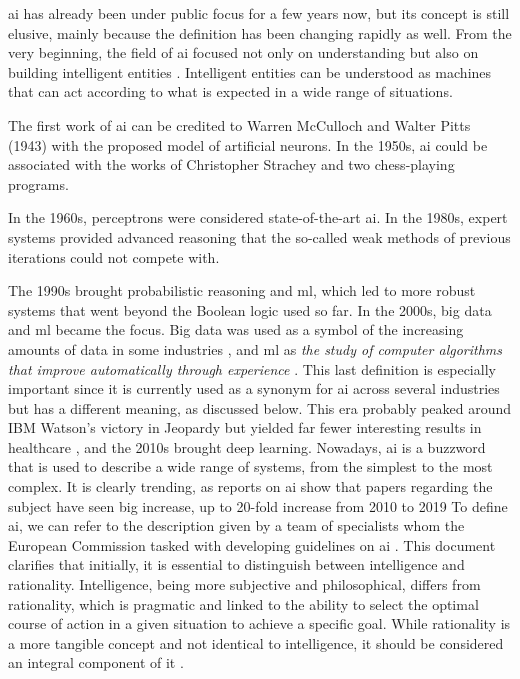 


\ac{ai} has already been under public focus for a few years now, but its concept is still elusive, mainly because the definition has been changing rapidly as well. From the very beginning, the field of \ac{ai} focused not only on understanding but also on building intelligent entities \cite{DBLP:books/aw/RN2020}. Intelligent entities can be understood as machines that can act according to what is expected in a wide range of situations.

The first work of \ac{ai} can be credited to Warren McCulloch and Walter Pitts (1943) with the proposed model of artificial neurons. In the 1950s, \ac{ai} could be associated with the works of Christopher Strachey and two chess-playing programs.

In the 1960s, perceptrons were considered state-of-the-art \ac{ai}. In the 1980s, expert systems provided advanced reasoning that the so-called weak methods of previous iterations could not compete with.

The 1990s brought probabilistic reasoning and \ac{ml}, which led to more robust systems that went beyond the Boolean logic used so far. In the 2000s, big data and \ac{ml} became the focus. Big data was used as a symbol of the increasing amounts of data in some industries \cite{dashBigDataHealthcare2019}, and \ac{ml} as \textit{the study of computer algorithms that improve automatically through experience} \cite{mitchell1997machine}. This last definition is especially important since it is currently used as a synonym for \ac{ai} across several industries but has a different meaning, as discussed below. This era probably peaked around IBM Watson's victory in Jeopardy but yielded far fewer interesting results in healthcare \cite{swetlitzIBMWatsonSupercomputer2018}, and the 2010s brought deep learning.
Nowadays, \ac{ai} is a buzzword that is used to describe a wide range of systems, from the simplest to the most complex. It is clearly trending, as reports on \ac{ai} show that papers regarding the subject have seen big increase, up to 20-fold increase from 2010 to 2019 \cite{DBLP:books/aw/RN2020, gaoQuantifyingBenefitArtificial2023, tobinBriefHistoricalOverview2019,AIIndexReport}
To define \ac{ai}, we can refer to the description given by a team of specialists whom the European Commission tasked with developing guidelines on \ac{ai} \cite{DefinitionAIMain2019}. This document clarifies that initially, it is essential to distinguish between intelligence and rationality. Intelligence, being more subjective and philosophical, differs from rationality, which is pragmatic and linked to the ability to select the optimal course of action in a given situation to achieve a specific goal. While rationality is a more tangible concept and not identical to intelligence, it should be considered an integral component of it \cite{DefinitionAIMain2019,DBLP:books/aw/RN2020}.

